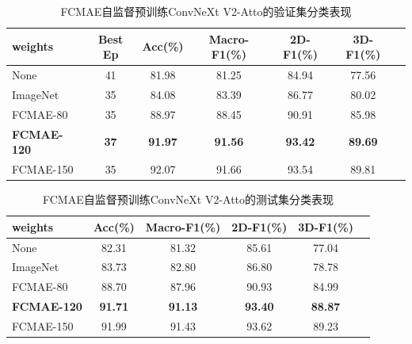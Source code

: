 \begin{table}[htbp]
    \centering
    \caption{FCMAE自监督预训练ConvNeXt V2-Atto的验证集分类表现}
    \label{tab:cp2_group2_weights_convnextv2_val}
    \begin{tabular}{lcccccc}
        \hline
        weights            & Best Ep     & Acc(\%)        & Macro-F1(\%)   & 2D-F1(\%)      & 3D-F1(\%)      \\
        \hline
        None               & 41          & 81.98          & 81.25          & 84.94          & 77.56          \\
        ImageNet           & 35          & 84.08          & 83.39          & 86.77          & 80.02          \\
        FCMAE-80           & 35          & 88.97          & 88.45          & 90.91          & 85.98          \\
        \textbf{FCMAE-120} & \textbf{37} & \textbf{91.97} & \textbf{91.56} & \textbf{93.42} & \textbf{89.69} \\
        FCMAE-150          & 35          & 92.07          & 91.66          & 93.54          & 89.81          \\
        \hline
    \end{tabular}
\end{table}

\begin{table}[htbp]
    \centering
    \caption{FCMAE自监督预训练ConvNeXt V2-Atto的测试集分类表现}
    \label{tab:cp2_group2_weights_convnextv2_test}
    \begin{tabular}{lccccc}
        \hline
        weights            & Acc(\%)        & Macro-F1(\%)   & 2D-F1(\%)      & 3D-F1(\%)      \\
        \hline
        None               & 82.31          & 81.32          & 85.61          & 77.04          \\
        ImageNet           & 83.73          & 82.80          & 86.80          & 78.78          \\
        FCMAE-80           & 88.70          & 87.96          & 90.93          & 84.99          \\
        \textbf{FCMAE-120} & \textbf{91.71} & \textbf{91.13} & \textbf{93.40} & \textbf{88.87} \\
        FCMAE-150          & 91.99          & 91.43          & 93.62          & 89.23          \\
        \hline
    \end{tabular}
\end{table}

